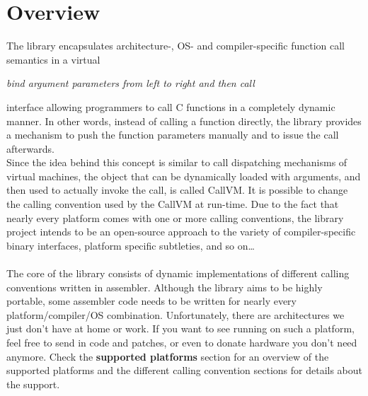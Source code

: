 \newpage

\section{Overview}

The  library encapsulates architecture-, OS- and compiler-specific
function call semantics in a virtual

\begin{center}
\emph{bind argument parameters from left to right and then call}
\end{center}
 
interface allowing programmers to call C functions 
in a completely dynamic manner. In other words, instead of calling a function 
directly, the  library provides a mechanism to push the function parameters 
manually and to issue the call afterwards.\\
Since the idea behind this concept is similar to call dispatching mechanisms
of virtual machines, the object that can be dynamically loaded with arguments,
and then used to actually invoke the call, is called CallVM. It is possible to
change the calling convention used by the CallVM at run-time.
Due to the fact that nearly every platform comes with one or more calling
conventions, the  library project intends to be an open-source approach
to the variety of compiler-specific binary interfaces, platform specific
subtleties, and so on\ldots\\
\\
The core of the library consists of dynamic implementations of different 
calling conventions written in assembler.
Although the library aims to be highly portable, some assembler code needs to 
be written for nearly every platform/compiler/OS combination.
Unfortunately, there are architectures we just don't have at home or work. If 
you want to see  running on such a platform, feel free to send
in code and patches, or even to donate hardware you don't need anymore.
Check the {\bf supported platforms} section for an overview of the supported 
platforms and the different calling convention sections for details about the 
support.
\\
\begin{comment}
@@@
A typical binary library consists of symbolic names that map to variables and
functions, the latter being pre-compiled for a
specific calling convention and architecture. Given \product{dyncall} has been ported to
that binary platform, it is possible to call such a function dynamically 
without writing glue code or prototypes or even knowing its C declaration - 
all that is needed is a pointer to it.\\
To avoid confusion, note that from the point of view of the library all 
parameters are handled the same way, even though the implementation might use
other ways to pass parameters in order to suit specific calling conventions.\\
\end{comment}



